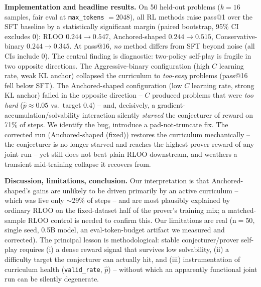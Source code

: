 \documentclass{article}
\begin{document}
\noindent\textbf{Implementation and headline results.}
On 50 held-out problems ($k{=}16$ samples, fair eval at \texttt{max\_tokens}
${=}2048$), all RL methods raise pass@1 over the SFT baseline by a
statistically significant margin (paired bootstrap, 95\% CI excludes 0):
RLOO $0.244{\to}0.547$, Anchored-shaped $0.244{\to}0.515$, Conservative-binary $0.244{\to}0.345$.
At pass@16, \emph{no} method differs from SFT beyond noise (all CIs include 0).
The central finding is diagnostic: two-policy self-play is fragile in two
opposite directions. The Aggressive-binary configuration (high $C$ learning rate,
weak KL anchor) collapsed the curriculum to \emph{too-easy} problems (pass@16 fell
below SFT). The Anchored-shaped configuration (low $C$ learning rate, strong KL
anchor) failed in the opposite direction -- $C$ produced problems that were \emph{too hard}
($\hat{p}\approx0.05$ vs.\ target $0.4$) -- and, decisively, a
gradient-accumulation/solvability interaction silently \emph{starved} the
conjecturer of reward on 71\% of steps. We identify the bug, introduce a
pad-not-truncate fix. The corrected run (Anchored-shaped (fixed)) restores the curriculum mechanically -- the conjecturer is no longer starved and reaches the highest prover reward of any joint run -- yet still does not beat plain RLOO downstream, and weathers a transient mid-training collapse it recovers from.

\noindent\textbf{Discussion, limitations, conclusion.}
Our interpretation is that Anchored-shaped's gains are unlikely to be driven primarily by an
active curriculum -- which was live only $\sim$29\% of steps -- and are most
plausibly explained by ordinary RLOO on the fixed-dataset half of the prover's
training mix; a matched-sample RLOO control is needed to confirm this. Our limitations are real (n${=}50$, single
seed, 0.5B model, an eval-token-budget artifact we measured and corrected). The
principal lesson is methodological: stable conjecturer/prover self-play requires (i)
a dense reward signal that survives low solvability, (ii) a difficulty target
the conjecturer can actually hit, and (iii) instrumentation of curriculum health
(\texttt{valid\_rate}, $\hat{p}$) -- without which an apparently functional joint
run can be silently degenerate.

\newpage
\end{document}
